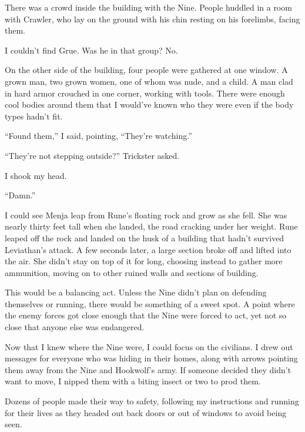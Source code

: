 There was a crowd inside the building with the Nine.  People huddled in a room with Crawler, who lay on the ground with his chin resting on his forelimbs, facing them.



I couldn't find Grue.  Was he in that group?  No.



On the other side of the building, four people were gathered at one window.  A grown man, two grown women, one of whom was nude, and a child.  A man clad in hard armor crouched in one corner, working with tools.  There were enough cool bodies around them that I would've known who they were even if the body types hadn't fit.



``Found them,'' I said, pointing, ``They're watching.''



``They're not stepping outside?''  Trickster asked.



I shook my head.



``Damn.''



I could see Menja leap from Rune's floating rock and grow as she fell.  She was nearly thirty feet tall when she landed, the road cracking under her weight.  Rune leaped off the rock and landed on the husk of a building that hadn't survived Leviathan's attack.  A few seconds later, a large section broke off and lifted into the air.  She didn't stay on top of it for long, choosing instead to gather more ammunition, moving on to other ruined walls and sections of building.



This would be a balancing act.  Unless the Nine didn't plan on defending themselves or running, there would be something of a sweet spot.  A point where the enemy forces got close enough that the Nine were forced to act, yet not so close that anyone else was endangered.



Now that I knew where the Nine were, I could focus on the civilians.  I drew out messages for everyone who was hiding in their homes, along with arrows pointing them away from the Nine and Hookwolf's army.  If someone decided they didn't want to move, I nipped them with a biting insect or two to prod them.



Dozens of people made their way to safety, following my instructions and running for their lives as they headed out back doors or out of windows to avoid being seen.



